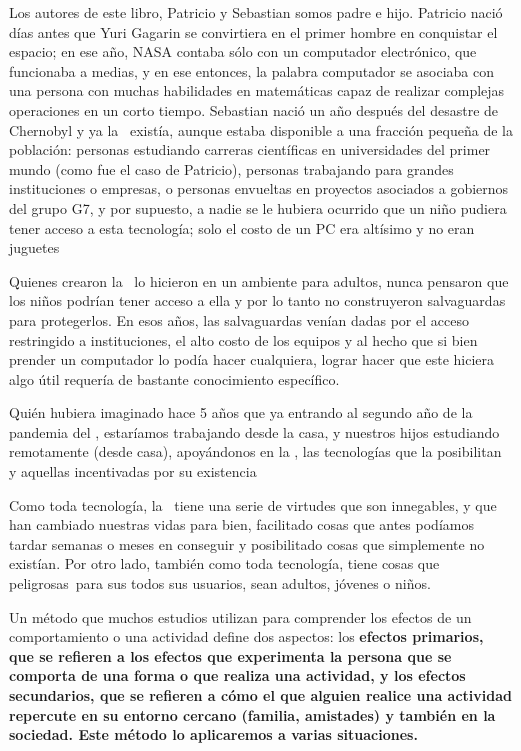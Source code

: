 
Los autores de este libro, Patricio y Sebastian somos padre e hijo.
Patricio naci\'o d\'ias antes que Yuri Gagarin se convirtiera en el primer
hombre en conquistar el espacio; en ese a\~no, NASA contaba s\'olo con un
computador electr\'onico, que funcionaba a medias, y en ese entonces, la
palabra computador se asociaba con una persona con muchas habilidades en
matem\'aticas capaz de realizar complejas operaciones en un corto tiempo.
Sebastian naci\'o un a\~no despu\'es del desastre de Chernobyl y ya la
\internet\ exist\'ia, aunque estaba disponible a una fracci\'on peque\~na
de la poblaci\'on: personas estudiando carreras cient\'ificas en
universidades del primer mundo (como fue el caso de Patricio), personas
trabajando para grandes instituciones o empresas, o personas envueltas en
proyectos asociados a gobiernos del grupo G7, y por supuesto, \oxm a nadie se le
hubiera ocurrido que un ni\~no pudiera tener acceso a esta tecnolog\'ia;
solo el
costo de un PC era alt\'isimo y no eran juguetes\cxm

Quienes crearon la \internet\ lo hicieron en un ambiente para adultos,
nunca pensaron que los ni\~nos podr\'ian tener acceso a ella y por lo tanto
no construyeron salvaguardas para protegerlos. En esos a\~nos, las
salvaguardas ven\'ian dadas por el acceso restringido a instituciones, el
alto costo de los equipos y al hecho que si bien prender un computador lo
pod\'ia hacer cualquiera, lograr hacer que este hiciera algo \'util
requer\'ia de bastante conocimiento espec\'ifico.

\oqm Qui\'en hubiera imaginado hace 5 a\~nos que ya entrando al segundo
a\~no de la pandemia del \coronavirus, estar\'iamos trabajando desde la
casa, y nuestros hijos estudiando remotamente (desde casa),
apoy\'andonos en la \internet, las tecnolog\'ias que la posibilitan y
aquellas incentivadas por su existencia\cqm


Como toda tecnolog\'ia, la \internet\ tiene una serie de virtudes que
son innegables, y que han cambiado nuestras vidas para bien, facilitado
cosas que antes pod\'iamos tardar semanas o meses en conseguir y
posibilitado cosas que simplemente no exist\'ian. Por otro lado, tambi\'en
como toda tecnolog\'ia, tiene cosas que \odq peligrosas\cdq\ para sus
todos sus usuarios, sean adultos, j\'ovenes o ni\~nos.

Un m\'etodo que muchos estudios utilizan para comprender los efectos de
un comportamiento o una actividad define dos aspectos: los \bf{efectos
primarios}, que se refieren a los efectos que experimenta la persona que
se comporta de una forma o que realiza una actividad, y los \bf{efectos
secundarios}, que se refieren a c\'omo el que alguien realice una
actividad repercute en su entorno cercano (familia, amistades) y
tambi\'en en la sociedad. Este m\'etodo lo aplicaremos a varias
situaciones.


